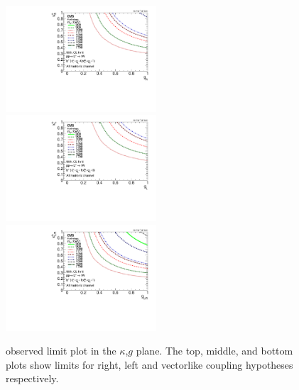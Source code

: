 \begin{figure}[htcb]
\centering
\includegraphics[width=0.5\textwidth]{AN-14-049/figs/bayesian_observed_hadronic_right_2Dlimit_plot.pdf}\\
\includegraphics[width=0.5\textwidth]{AN-14-049/figs/bayesian_observed_hadronic_left_2Dlimit_plot.pdf}\\
\includegraphics[width=0.5\textwidth]{AN-14-049/figs/bayesian_observed_hadronic_vector_2Dlimit_plot.pdf}\\
\caption{observed limit plot in the $\kappa$,$g$ plane.  The top, middle, and bottom plots show limits for right, left and vectorlike coupling hypotheses respectively.}
\label{figs:bsthetalimit2dobs}
\end{figure}


